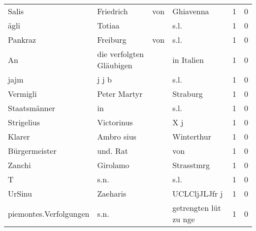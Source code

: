 \begin{center}
\begin{tiny}
\begin{longtabu}{llllrr}
                    Salis &                          Friedrich &         von &                                   Ghiavenna &          1 &         0 \\
                     ägli &                             Totiaa &             &                                        s.l. &          1 &         0 \\
                  Pankraz &                           Freiburg &         von &                                        s.l. &          1 &         0 \\
                       An &           die verfolgten Gläubigen &             &                                  in Italien &          1 &         0 \\
                     jajm &                              j j b &             &                                        s.l. &          1 &         0 \\
                 Vermigli &                       Peter Martyr &             &                                    Straburg &          1 &         0 \\
             Staatsmänner &                                 in &             &                                        s.l. &          1 &         0 \\
               Strigelius &                         Victorinus &             &                                         X j &          1 &         0 \\
                   Klarer &                         Ambro sius &             &                                  Winterthur &          1 &         0 \\
            Bürgermeister &                           und. Rat &             &                                         von &          1 &         0 \\
                   Zanchi &                           Girolamo &             &                                  Strasstmrg &          1 &         0 \\
                        T &                               s.n. &             &                                        s.l. &          1 &         0 \\
                   UrSinu &                           Zaeharis &             &                               UCLCljJLJfr j &          1 &         0 \\
   piemontes.Verfolgungen &                               s.n. &             &                       getrengten lüt zu nge &          1 &         0 \\

\end{longtabu}
\end{tiny}
\end{center}
